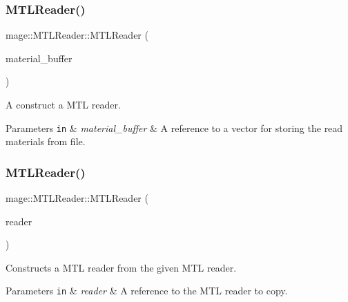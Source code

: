 \subsubsection{\texorpdfstring{M\+T\+L\+Reader()}{MTLReader()}\hspace{0.1cm}{\footnotesize\ttfamily [1/3]}}
{\footnotesize\ttfamily mage\+::\+M\+T\+L\+Reader\+::\+M\+T\+L\+Reader (\begin{DoxyParamCaption}\item[{vector$<$ \hyperlink{structmage_1_1_material}{Material} $>$ \&}]{material\+\_\+buffer }\end{DoxyParamCaption})\hspace{0.3cm}{\ttfamily [explicit]}}

A construct a M\+TL reader.


\begin{DoxyParams}[1]{Parameters}
\mbox{\tt in}  & {\em material\+\_\+buffer} & A reference to a vector for storing the read materials from file. \\
\hline
\end{DoxyParams}
\hypertarget{classmage_1_1_m_t_l_reader_adcc57156298b2198c24c041503df2e6d}{}\label{classmage_1_1_m_t_l_reader_adcc57156298b2198c24c041503df2e6d} 
\subsubsection{\texorpdfstring{M\+T\+L\+Reader()}{MTLReader()}\hspace{0.1cm}{\footnotesize\ttfamily [2/3]}}
{\footnotesize\ttfamily mage\+::\+M\+T\+L\+Reader\+::\+M\+T\+L\+Reader (\begin{DoxyParamCaption}\item[{const \hyperlink{classmage_1_1_m_t_l_reader}{M\+T\+L\+Reader} \&}]{reader }\end{DoxyParamCaption})\hspace{0.3cm}{\ttfamily [delete]}}

Constructs a M\+TL reader from the given M\+TL reader.


\begin{DoxyParams}[1]{Parameters}
\mbox{\tt in}  & {\em reader} & A reference to the M\+TL reader to copy. \\
\hline
\end{DoxyParams}
\hypertarget{classmage_1_1_m_t_l_reader_a415057f591e54e91658c77092b7b2d4e}{}\label{classmage_1_1_m_t_l_reader_a415057f591e54e91658c77092b7b2d4e} 
